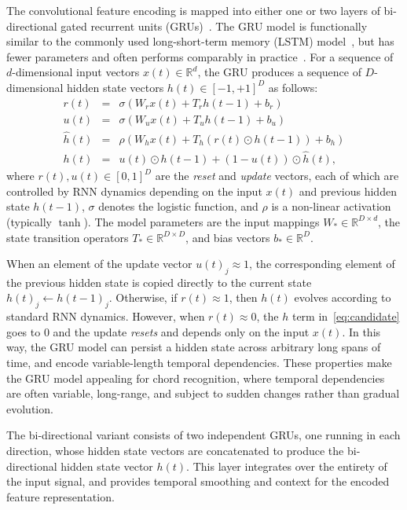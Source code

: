 \documentclass{article}
\begin{document}
The convolutional feature encoding is mapped into either one or two layers of bi-directional gated recurrent units (GRUs)~\cite{cho2014learning}.
The GRU model is functionally similar to the commonly used long-short-term memory (LSTM) model~\cite{hochreiter1997long}, but has fewer parameters and often performs comparably in practice~\cite{jozefowicz2015empirical}.
For a sequence of $d$-dimensional input vectors $x(t) \in \mathbb{R}^d$, the GRU produces a sequence of $D$-dimensional hidden state vectors $h(t) \in [-1, +1]^D$ as follows:
\begin{eqnarray}
    r(t) &=& \sigma\left(W_r x(t) + T_r h(t-1) + b_r\right)\\
    u(t) &=& \sigma\left(W_u x(t) + T_u h(t-1) + b_u\right)\\
    \hat{h}(t) &=& \rho\left(W_h x(t) + T_h \left( r(t) \odot h(t-1) \right) + b_h \right)\label{eq:candidate}\\
    h(t) &=& u(t) \odot h(t-1) + (1-u(t)) \odot \hat{h}(t),
\end{eqnarray}
where $r(t), u(t) \in [0,1]^D$ are the \emph{reset} and \emph{update} vectors, each of which are controlled by RNN dynamics depending on the input $x(t)$ and previous hidden state $h(t-1)$, $\sigma$ denotes the logistic function, and $\rho$ is a non-linear activation (typically $\tanh$).
The model parameters are the input mappings $W_* \in \mathbb{R}^{D\times d}$, the state transition operators $T_* \in \mathbb{R}^{D\times D}$, and bias vectors $b_* \in \mathbb{R}^D$.

When an element of the update vector ${u(t)}_j \approx 1$, the corresponding element of the previous hidden state is copied directly to the current state ${h(t)}_j \leftarrow {h(t-1)}_j$.
Otherwise, if $r(t) \approx 1$, then $h(t)$ evolves according to standard RNN dynamics.
However, when $r(t) \approx 0$, the $h$ term in~\eqref{eq:candidate} goes to 0 and the update \emph{resets} and depends only on the input $x(t)$.
In this way, the GRU model can persist a hidden state across arbitrary long spans of time, and encode variable-length temporal dependencies.
These properties make the GRU model appealing for chord recognition, where temporal dependencies are often variable, long-range, and subject to sudden changes rather than gradual evolution.

The bi-directional variant consists of two independent GRUs, one running in each direction, whose hidden state vectors are concatenated to produce the bi-directional hidden state vector $h(t)$.
This layer integrates over the entirety of the input signal, and provides temporal smoothing and context for the encoded feature representation.
\end{document}
